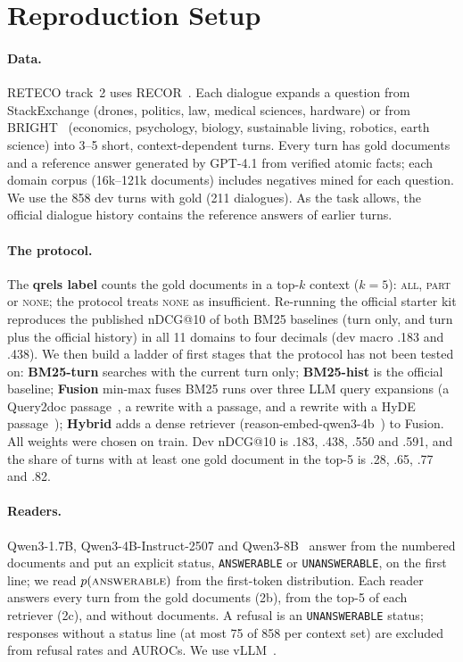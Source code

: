 \documentclass[11pt]{article}
\newcommand{\qnone}{\textnormal{\textsc{none}}}
\begin{document}
\section{Reproduction Setup}
\label{sec:setup}

\paragraph{Data.}
RETECO track~2 uses RECOR~\cite{ali2026recor}. Each dialogue expands a question from StackExchange (drones, politics, law, medical sciences, hardware) or from BRIGHT~\cite{su2025bright} (economics, psychology, biology, sustainable living, robotics, earth science) into 3--5 short, context-dependent turns. Every turn has gold documents and a reference answer generated by GPT-4.1 from verified atomic facts; each domain corpus (16k--121k documents) includes negatives mined for each question. We use the 858 dev turns with gold (211 dialogues). As the task allows, the official dialogue history contains the reference answers of earlier turns.

\paragraph{The protocol.}
The \textbf{qrels label} counts the gold documents in a top-$k$ context ($k{=}5$): \textsc{all}, \textsc{part} or \qnone; the protocol treats \qnone{} as insufficient. Re-running the official starter kit reproduces the published nDCG@10 of both BM25 baselines (turn only, and turn plus the official history) in all 11 domains to four decimals (dev macro .183 and .438). We then build a ladder of first stages that the protocol has not been tested on:
\textbf{BM25-turn} searches with the current turn only;
\textbf{BM25-hist} is the official baseline;
\textbf{Fusion} min-max fuses BM25 runs over three LLM query expansions (a Query2doc passage~\cite{wang2023query2doc}, a rewrite with a passage, and a rewrite with a HyDE passage~\cite{gao2023precise});
\textbf{Hybrid} adds a dense retriever (reason-embed-qwen3-4b~\cite{chen2026reasonembed}) to Fusion.
All weights were chosen on train. Dev nDCG@10 is .183, .438, .550 and .591, and the share of turns with at least one gold document in the top-5 is .28, .65, .77 and .82.

\paragraph{Readers.}
Qwen3-1.7B, Qwen3-4B-Instruct-2507 and Qwen3-8B~\cite{yang2025qwen3} answer from the numbered documents and put an explicit status, \texttt{ANSWERABLE} or \texttt{UNANSWERABLE}, on the first line; we read $p(\textsc{answerable})$ from the first-token distribution. Each reader answers every turn from the gold documents (2b), from the top-5 of each retriever (2c), and without documents. A refusal is an \texttt{UNANSWERABLE} status; responses without a status line (at most 75 of 858 per context set) are excluded from refusal rates and AUROCs. We use vLLM~\cite{kwon2023vllm}.
\end{document}
